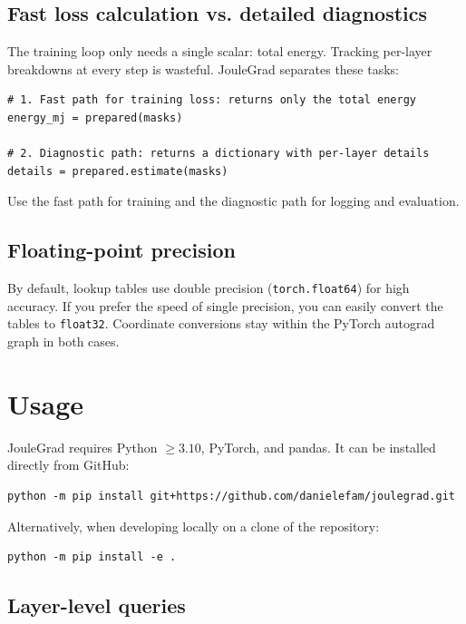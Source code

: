 \subsection{Fast loss calculation vs. detailed diagnostics}

The training loop only needs a single scalar: total energy. Tracking per-layer breakdowns at every step is wasteful. JouleGrad separates these tasks:

\begin{lstlisting}
# 1. Fast path for training loss: returns only the total energy
energy_mj = prepared(masks)

# 2. Diagnostic path: returns a dictionary with per-layer details
details = prepared.estimate(masks)
\end{lstlisting}

Use the fast path for training and the diagnostic path for logging and evaluation.

\subsection{Floating-point precision}

By default, lookup tables use double precision (\texttt{torch.float64}) for high accuracy. If you prefer the speed of single precision, you can easily convert the tables to \texttt{float32}. Coordinate conversions stay within the PyTorch autograd graph in both cases.

\section{Usage}

JouleGrad requires Python $\ge 3.10$, PyTorch, and pandas. It can be installed directly from GitHub:

\begin{lstlisting}
python -m pip install git+https://github.com/danielefam/joulegrad.git
\end{lstlisting}

Alternatively, when developing locally on a clone of the repository:

\begin{lstlisting}
python -m pip install -e .
\end{lstlisting}

\subsection{Layer-level queries}

